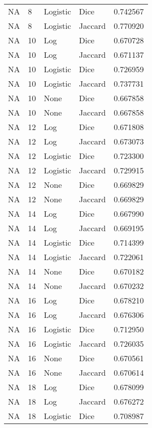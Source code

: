 \documentclass{article}
\begin{document}
\begin{center}
\begin{supertabular}{| l | l | l | l | l |}
            NA & 8 & Logistic & Dice & 0.742567 \\
            NA & 8 & Logistic & Jaccard & 0.770920 \\
            NA & 10 & Log & Dice & 0.670728 \\
            NA & 10 & Log & Jaccard & 0.671137 \\
            NA & 10 & Logistic & Dice & 0.726959 \\
            NA & 10 & Logistic & Jaccard & 0.737731 \\
            NA & 10 & None & Dice & 0.667858 \\
            NA & 10 & None & Jaccard & 0.667858 \\
            NA & 12 & Log & Dice & 0.671808 \\
            NA & 12 & Log & Jaccard & 0.673073 \\
            NA & 12 & Logistic & Dice & 0.723300 \\
            NA & 12 & Logistic & Jaccard & 0.729915 \\
            NA & 12 & None & Dice & 0.669829 \\
            NA & 12 & None & Jaccard & 0.669829 \\
            NA & 14 & Log & Dice & 0.667990 \\
            NA & 14 & Log & Jaccard & 0.669195 \\
            NA & 14 & Logistic & Dice & 0.714399 \\
            NA & 14 & Logistic & Jaccard & 0.722061 \\
            NA & 14 & None & Dice & 0.670182 \\
            NA & 14 & None & Jaccard & 0.670232 \\
            NA & 16 & Log & Dice & 0.678210 \\
            NA & 16 & Log & Jaccard & 0.676306 \\
            NA & 16 & Logistic & Dice & 0.712950 \\
            NA & 16 & Logistic & Jaccard & 0.726035 \\
            NA & 16 & None & Dice & 0.670561 \\
            NA & 16 & None & Jaccard & 0.670614 \\
            NA & 18 & Log & Dice & 0.678099 \\
            NA & 18 & Log & Jaccard & 0.676272 \\
            NA & 18 & Logistic & Dice & 0.708987 \\

\end{supertabular}
\end{center}
\end{document}
